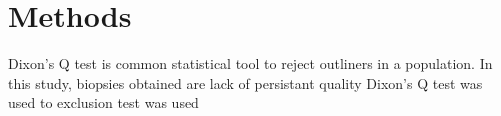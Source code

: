 \chapter{Methods}

Dixon's Q test is common statistical tool to reject outliners in a population. In this study, biopsies obtained are lack of persistant quality Dixon's Q test was used to   exclusion test was used 